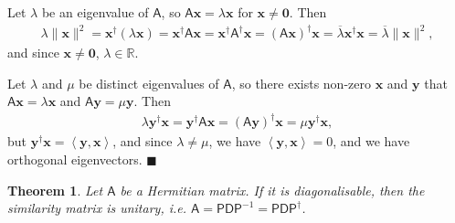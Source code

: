 \documentclass[letter-paper]{tufte-book}
\newtheorem{theorem}{\color{pastel-blue}Theorem}[section]
\newenvironment{proof}[1][Proof]{\begin{trivlist}
\item[\hskip \labelsep {\bfseries #1}]}{\end{trivlist}}
\newcommand{\inner}[2]{\left\langle #1, #2\right\rangle}
\newcommand{\As}{{\mathsf{A}}}
\newcommand{\Ds}{{\mathsf{D}}}
\newcommand{\Ps}{{\mathsf{P}}}
\newcommand{\Ob}{{\boldsymbol{0}}}
\newcommand{\xb}{{\boldsymbol{x}}}
\newcommand{\yb}{{\boldsymbol{y}}}
\newcommand{\qed}{\hfill$\blacksquare$}
\begin{document}
\begin{proof}
  Let $\lambda$ be an eigenvalue of $\As$, so $\As\xb = \lambda \xb$ for $\xb \neq \Ob$. Then
  \begin{align*}
    \lambda\|\xb\|^2 = \xb^\dagger (\lambda\xb) = \xb^\dagger \As \xb = \xb^\dagger \As^\dagger \xb = (\As\xb)^\dagger \xb = \overline{\lambda}\xb^\dagger \xb = \overline{\lambda}\|\xb\|^2,
  \end{align*}
  and since $\xb\neq\Ob$, $\lambda\in\mathbb{R}$.
  
  Let $\lambda$ and $\mu$ be distinct eigenvalues of $\As$, so there exists non-zero $\xb$ and $\yb$ that $\As\xb = \lambda\xb$ and $\As\yb = \mu\yb$. Then
  \begin{align*}
    \lambda\yb^\dagger\xb = \yb^\dagger \As\xb = (\As\yb)^\dagger \xb = \mu \yb^\dagger\xb,
  \end{align*}
  but $\yb^\dagger\xb = \inner{\yb}{\xb}$, and since $\lambda\neq \mu$, we have $\inner{\yb}{\xb} = 0$, and we have orthogonal eigenvectors. \qed
\end{proof}

\begin{theorem}
  Let $\As$ be a Hermitian matrix. If it is diagonalisable, then the similarity matrix is unitary, i.e. $\As = \Ps \Ds \Ps^{-1} = \Ps \Ds \Ps^\dagger$.
\end{theorem}
\end{document}
